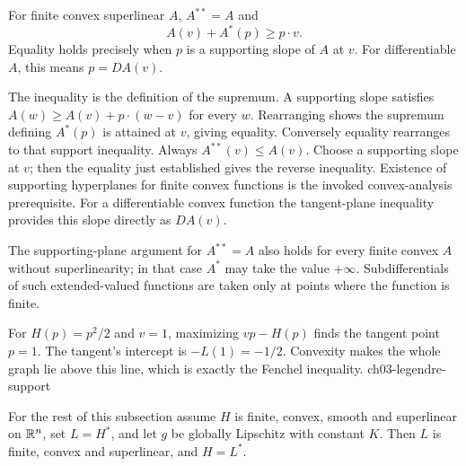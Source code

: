 \begin{theorem}
For finite convex superlinear $A$, $A^{**}=A$ and
\[
 A(v)+A^*(p)\geq p\cdot v.
\]
Equality holds precisely when $p$ is a supporting slope of $A$ at $v$.
For differentiable $A$, this means $p=DA(v)$.
\end{theorem}
\begin{expandedproof}
The inequality is the definition of the supremum.
A supporting slope satisfies
$A(w)\geq A(v)+p\cdot(w-v)$ for every $w$.
Rearranging shows the supremum defining $A^*(p)$ is attained at $v$,
giving equality. Conversely equality rearranges to that support inequality.
Always $A^{**}(v)\leq A(v)$. Choose a supporting slope at $v$;
then the equality just established gives the reverse inequality.
Existence of supporting hyperplanes for finite convex functions is
the invoked convex-analysis prerequisite.
For a differentiable convex function the tangent-plane inequality
provides this slope directly as $DA(v)$.
\end{expandedproof}
The supporting-plane argument for $A^{**}=A$ also holds for every
finite convex $A$ without superlinearity; in that case $A^*$ may take
the value $+\infty$. Subdifferentials of such extended-valued functions
are taken only at points where the function is finite.
\Needspace{45mm}

{For $H(p)=p^2/2$ and $v=1$, maximizing $vp-H(p)$ finds the tangent point $p=1$. The tangent's intercept is $-L(1)=-1/2$. Convexity makes the whole graph lie above this line, which is exactly the Fenchel inequality.}
{ch03-legendre-support}

For the rest of this subsection assume $H$ is finite, convex, smooth
and superlinear on $\mathbb{R}^n$, set $L=H^*$, and let $g$ be globally
Lipschitz with constant $K$. Then $L$ is finite, convex and superlinear,
and $H=L^*$.

\Needspace{45mm}

